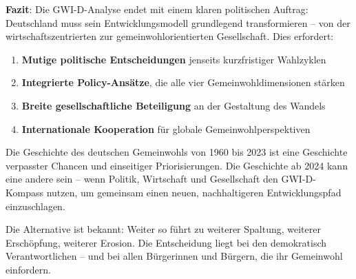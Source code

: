 \textbf{Fazit}: Die GWI-D-Analyse endet mit einem klaren politischen Auftrag: Deutschland muss sein Entwicklungsmodell grundlegend transformieren – von der wirtschaftszentrierten zur gemeinwohlorientierten Gesellschaft. Dies erfordert:

\begin{enumerate}
    \item \textbf{Mutige politische Entscheidungen} jenseits kurzfristiger Wahlzyklen
    \item \textbf{Integrierte Policy-Ansätze}, die alle vier Gemeinwohldimensionen stärken
    \item \textbf{Breite gesellschaftliche Beteiligung} an der Gestaltung des Wandels
    \item \textbf{Internationale Kooperation} für globale Gemeinwohlperspektiven
\end{enumerate}

Die Geschichte des deutschen Gemeinwohls von 1960 bis 2023 ist eine Geschichte verpasster Chancen und einseitiger Priorisierungen. Die Geschichte ab 2024 kann eine andere sein – wenn Politik, Wirtschaft und Gesellschaft den GWI-D-Kompass nutzen, um gemeinsam einen neuen, nachhaltigeren Entwicklungspfad einzuschlagen.

Die Alternative ist bekannt: Weiter so führt zu weiterer Spaltung, weiterer Erschöpfung, weiterer Erosion. Die Entscheidung liegt bei den demokratisch Verantwortlichen – und bei allen Bürgerinnen und Bürgern, die ihr Gemeinwohl einfordern.

\endinput